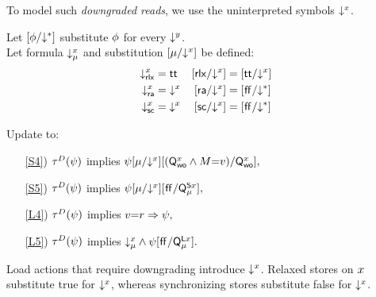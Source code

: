 To model such \emph{downgraded reads}, we use the uninterpreted symbols
$\mathord{\downarrow^{x}}$.  

\begin{definition}
  \label{def:DS}
  Let $[\phi/\mathord{\downarrow^{*}}]$ substitute $\phi$ for every $\mathord{\downarrow^{y}}$.\\
  Let formula $\mathord{\downarrow^{x}_{\mu}}$ and substitution ${[}{\mu}/\mathord{\downarrow^{x}}{]}$ be defined:
  \begin{align*}
    \DL{\aLoc}{\mRLX}&=\TRUE
    &\DS{\aLoc}{\mRLX}&=[\TRUE/\Dx{\aLoc}] 
    \\
    \DL{\aLoc}{\mRA}&=\Dx{\aLoc}%
    &\DS{\aLoc}{\mRA}&=[\FALSE/\D]
    \\
    \DL{\aLoc}{\mSC}&=\Dx{\aLoc}%
    &\DS{\aLoc}{\mSC}&=[\FALSE/\D]
  \end{align*}
\end{definition}
\begin{definition}[\xCO/\xRASC/\xDGR]
  \label{def:pomsets-down}
  Update  to: %
  \begin{enumerate}
  \item[\ref{S4})]
    $\aTr{\bEvs}{\bForm}$ implies
    \begin{math}
      \psi
      {[}{\mu}/\mathord{\downarrow^{x}}{]}
      [(\mathsf{Q}_{\mathsf{wo}}^{x}\land M{=}v)/\mathsf{Q}_{\mathsf{wo}}^{x}],
    \end{math}
  \item[\ref{S5})]
    $\aTr{\cEvs}{\bForm}$ implies
    \begin{math}
      \psi
      {[}{\mu}/\mathord{\downarrow^{x}}{]}
      [\mkern.6mu\mathsf{ff}\mkern.6mu/\smash{\mathsf{Q}_{\mu}^{\mathsf{S}x}}],
    \end{math}
  \item[\ref{L4})]
    $\aTr{\bEvs}{\bForm}$ implies
    \begin{math}
      v{=}r\Rightarrow\psi,
    \end{math}
  \item[\ref{L5})]
    $\aTr{\cEvs}{\bForm}$ implies
    \begin{math}
      \mathord{\downarrow^{x}_{\mu}}\land \psi[\mkern.6mu\mathsf{ff}\mkern.6mu/\smash{\mathsf{Q}_{\mu}^{\mathsf{L}x}}].
    \end{math}
  \end{enumerate}
\end{definition}
Load actions that require downgrading introduce $\mathord{\downarrow^{x}}$.
Relaxed stores on $x$ substitute true for $\mathord{\downarrow^{x}}$, whereas
synchronizing stores substitute false for $\mathord{\downarrow^{x}}$.

